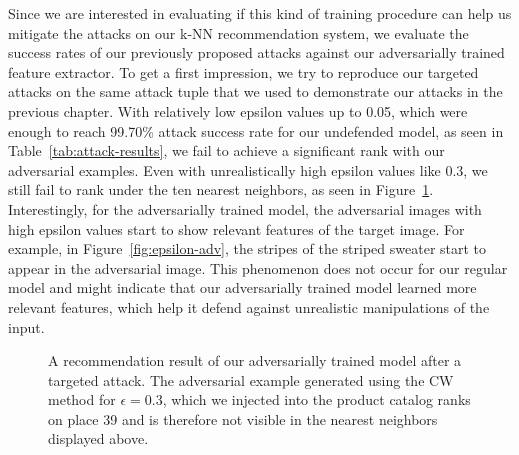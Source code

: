 Since we are interested in evaluating if this kind of training procedure can help us mitigate the attacks on our \ac{k-NN} recommendation system, we evaluate the success rates of our previously proposed attacks against our adversarially trained feature extractor. To get a first impression, we try to reproduce our targeted attacks on the same attack tuple that we used to demonstrate our attacks in the previous chapter. With relatively low epsilon values up to 0.05, which were enough to reach 99.70\% attack success rate for our undefended model, as seen in Table~\ref{tab:attack-results}, we fail to achieve a significant rank with our adversarial examples. Even with unrealistically high epsilon values like 0.3, we still fail to rank under the ten nearest neighbors, as seen in Figure~\ref{fig:adv-reco}. Interestingly, for the adversarially trained model, the adversarial images with high epsilon values start to show relevant features of the target image. For example, in Figure~\ref{fig:epsilon-adv}, the stripes of the striped sweater start to appear in the adversarial image. This phenomenon does not occur for our regular model and might indicate that our adversarially trained model learned more relevant features, which help it defend against unrealistic manipulations of the input. 
\begin{figure}[H]
	\centering
	
	\caption{A recommendation result of our adversarially trained model after a targeted attack. The  adversarial example generated using the \ac{CW} method for $\epsilon=0.3$, which we injected into the product catalog ranks on place 39 and is therefore not visible in the nearest neighbors displayed above.}
	\label{fig:adv-reco}
\end{figure}

